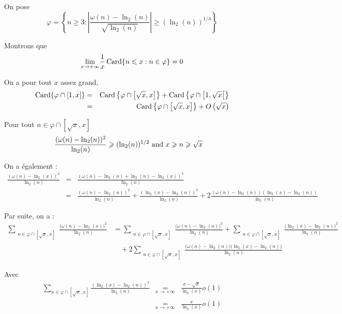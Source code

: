  On pose
\[ \varphi = \left\{ n \geqslant 3 : \left| \frac{\omega (n) - \ln_2
   (n)}{\sqrt{\ln_2 (n)}} \right| \geqslant (\ln_2 (n))^{1 / 4} \right\} \]


Montrons que
\[ \underset{x \rightarrow + \infty}{\lim} \frac{1}{x} \operatorname{Card} \{ n
   \leqslant x : n \in \varphi \} = 0 \]


On a pour tout $x$ assez grand,
\begin{eqnarray*}
  \operatorname{Card} \{ \varphi \cap [1, x] \} & = & \operatorname{Card} \left\{ \varphi \cap
  \left[ \sqrt{x}, x \right] \right\} + \operatorname{Card} \left\{ \varphi \cap
  \left[ 1, \sqrt{x} \right[ \right\}\\
  & = & \operatorname{Card} \left\{ \varphi \cap \left[ \sqrt{x}, x \right] \right\}
  + O \left( \sqrt{x} \right)
\end{eqnarray*}


Pour tout $n \in \varphi \cap \left[ \sqrt{x}, x \right]$
\begin{eqnarray*}
  & \frac{(\omega (n) - \ln_2 (n))^2}{\ln_2 (n)} \geqslant (\ln_2 (n))^{1 /
  2} \text{ and } x \geqslant n \geqslant \sqrt{x}
\end{eqnarray*}


On a {\'e}galement :
\begin{eqnarray*}
  \frac{(\omega (n) - \ln_2 (x))^2}{\ln_2 (n)} & = & \frac{(\omega (n) - \ln_2
  (n) + \ln_2 (n) - \ln_2 (x))^2}{\ln_2 (n)}\\
  & = & \frac{(\omega (n) - \ln_2 (n))^2}{\ln_2 (n)} + \frac{(\ln_2 (x) -
  \ln_2 (n))^2}{\ln_2 (n)} + 2 \frac{(\omega (n) - \ln_2 (n)) (\ln_2 (x) -
  \ln_2 (n))}{\ln_2 (n)}
\end{eqnarray*}


Par suite, on a :
\begin{align*}
\sum_{\substack{n \in \varphi \cap \left[\sqrt{x}, x\right]}} 
\frac{\bigl(\omega(n) - \ln_2(x)\bigr)^2}{\ln_2(n)}
&=
\sum_{\substack{n \in \varphi \cap \left[\sqrt{x}, x\right]}} 
\frac{\bigl(\omega(n) - \ln_2(n)\bigr)^2}{\ln_2(n)}
+ \sum_{\substack{n \in \varphi \cap \left[\sqrt{x}, x\right]}} 
\frac{\bigl(\ln_2(x) - \ln_2(n)\bigr)^2}{\ln_2(n)} \\[1ex]
&\quad + 2 \sum_{\substack{n \in \varphi \cap \left[\sqrt{x}, x\right]}} 
\frac{\bigl(\omega(n) - \ln_2(n)\bigr) \bigl(\ln_2(x) - \ln_2(n)\bigr)}{\ln_2(n)}
\end{align*}

Avec
\begin{eqnarray*}
  \underset{n \in \varphi \cap \left[ \sqrt{x}, x \right]}{\sum} \frac{(\ln_2
  (x) - \ln_2 (n))^2}{\ln_2 (n)} & \underset{x \rightarrow + \infty}{=} &
  \frac{x - \sqrt{x}}{\ln_2 (x)} o (1)\\
  & \underset{x \rightarrow + \infty}{=} & \frac{x}{\ln_2 (x)} o (1)
\end{eqnarray*}


